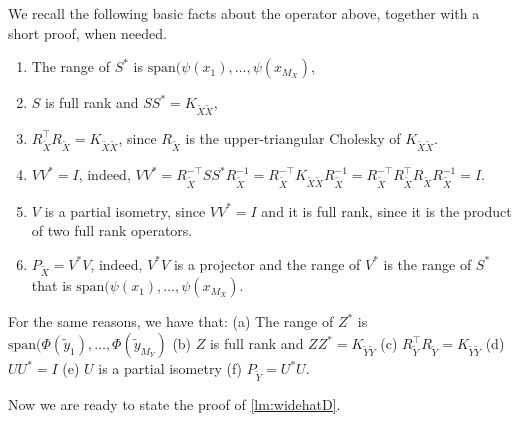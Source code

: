 \begin{remark}\label{rem:operators}
We recall the following basic facts about the operator above, together with a short proof, when needed.
\begin{enumerate}
    \item The range of $S^*$ is $\textrm{span}(\psi(x_1),\dots,\psi(x_{M_X})$,
    \item $S$ is full rank and  $SS^* = K_{\tilde{X} \tilde{X}}$,
    \item $R_{\tilde{X}}^\top R_{\tilde{X}} = K_{\tilde{X} \tilde{X}}$, since $R_{\tilde{X}}$ is the upper-triangular Cholesky of $K_{\tilde{X} \tilde{X}}$.
    \item  $VV^* = I$, indeed, $VV^*  = R^{-\top}_{\tilde X} S S^* R^{-1}_{\tilde X}  = R^{-\top}_{\tilde X} K_{\tilde{X} \tilde{X}} R^{-1}_{\tilde X}  = R^{-\top}_{\tilde X} R_{\tilde{X}}^\top R_{\tilde{X}} R^{-1}_{\tilde X} = I.$
    \item $V$ is a partial isometry, since $VV^* = I$ and it is full rank, since it is the product of two full rank operators.
    \item $P_{\tilde{X}} = V^*V$, indeed, $V^*V$ is a projector and the range of $V^*$ is the range of $S^*$ that is $\textrm{span}(\psi(x_1),\dots,\psi(x_{M_X})$.
\end{enumerate}
For the same reasons, we have that: (a) The range of $Z^*$ is $\textrm{span}(\Phi(\tilde{y}_1),\dots,\Phi(\tilde{y}_{M_Y})$ (b) $Z$ is full rank and $ZZ^* = K_{\tilde{Y} \tilde{Y}}$ (c) $R_{\tilde{Y}}^\top R_{\tilde{Y}} = K_{\tilde{Y} \tilde{Y}}$ (d) $UU^* = I$ (e) $U$ is a partial isometry (f) $P_{\tilde{Y}} = U^*U$.
\end{remark}

Now we are ready to state the proof of \cref{lm:widehatD}.

